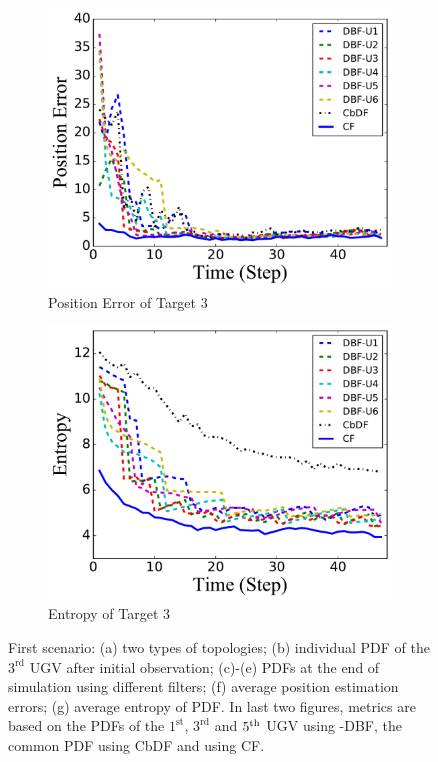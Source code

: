 \begin{figure}
		\begin{subfigure}[b]{0.23\textwidth}
			\includegraphics[width=\textwidth]{figures/hetero_mov_sen_mov_tar_pos_err_noise_sin}
			\caption{Position Error of Target $3$}\label{fig:sin_pos_err}
		\end{subfigure}
		\begin{subfigure}[b]{0.23\textwidth}
			\includegraphics[width=\textwidth]{figures/hetero_mov_sen_mov_tar_entropy_noise_sin}
			\caption{Entropy of Target $3$}\label{fig:sin_ent}
		\end{subfigure}		
		\caption{First scenario: (a) two types of topologies; (b) individual PDF of the $3^\text{rd}$ UGV after initial observation; (c)-(e) PDFs at the end of simulation using different filters; (f) average position estimation errors; (g) average entropy of PDF. In last two figures, metrics are based on the PDFs of the $1^\text{st}$, $3^\text{rd}$ and $5^\text{th}$ UGV using \proto-DBF, the common PDF using CbDF and using CF. 
			}
		\label{fig:metrics}
	\end{figure}		